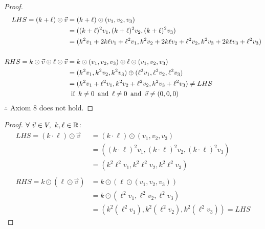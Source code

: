 \documentclass{article}
\begin{document}
\begin{enumerate}
\begin{proof}
\begin{align*}
            LHS = (k+\ell) \odot \vec{v}                    & = (k+\ell) \odot (v_1,v_2,v_3)                                                          \\
                                                            & = ((k+\ell)^2v_1,(k+\ell)^2v_2,(k+\ell)^2v_3)                                           \\
                                                            & = (k^2v_1+2k\ell v_1+\ell^2v_1,k^2v_2+2k\ell v_2+\ell^2v_2,k^2v_3+2k\ell v_3+\ell^2v_3) \\ \\
            RHS = k \odot \vec{v} \oplus \ell \odot \vec{v} & = k \odot (v_1,v_2,v_3) \oplus \ell \odot (v_1,v_2,v_3)                                 \\
                                                            & = (k^2v_1,k^2v_2,k^2v_3) \oplus (\ell^2v_1,\ell^2v_2,\ell^2v_3)                         \\
                                                            & = (k^2v_1 + \ell^2v_1, k^2v_2 + \ell^2v_2, k^2v_3 + \ell^2v_3) \neq LHS                 \\
                                                            & \operatorname{~\text{if}~} k \neq 0 \operatorname{~\text{and}~} \ell \neq 0 \operatorname{~\text{and}~} \vec{v} \neq (0,0,0)
        \end{align*}
        $\therefore$ Axiom 8 does not hold.
    \end{proof}
    \begin{proof}
        $\forall~\vec{v} \in V,~k,\ell \in \mathbb{R}$:
        \begin{align*}
            LHS = (k \cdot \ell) \odot \vec{v} & = (k \cdot \ell) \odot (v_1,v_2,v_3)                              \\
                                               & = ((k \cdot \ell)^2v_1, (k \cdot \ell)^2v_2, (k \cdot \ell)^2v_3) \\
                                               & = (k^2\ell^2v_1,k^2\ell^2v_2,k^2\ell^2v_3)                        \\ \\
            RHS = k \odot (\ell \odot \vec{v}) & = k \odot (\ell \odot (v_1,v_2,v_3))                              \\
                                               & = k \odot (\ell^2v_1,\ell^2v_2,\ell^2v_3)                         \\
                                               & = (k^2(\ell^2v_1),k^2(\ell^2v_2),k^2(\ell^2v_3)) = LHS

\end{align*}
\end{proof}
\end{enumerate}
\end{document}

